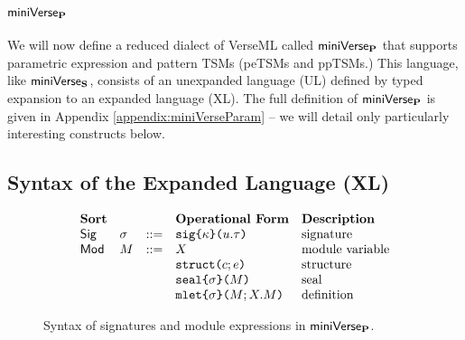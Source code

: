 \section{\texorpdfstring{$\miniVerseParam$}{miniVerseP}}\label{sec:miniVerseP}
We will now define a reduced dialect of VerseML called $\miniVerseParam$ that supports parametric expression and pattern TSMs (peTSMs and ppTSMs.) This language, like $\mathsf{miniVerse}_\textbf{S}$, consists of an unexpanded language (UL) defined by typed expansion to an expanded language (XL). The full definition of $\miniVerseParam$ is given in Appendix \ref{appendix:miniVerseParam} -- we will detail only  particularly interesting constructs below.

\subsection{Syntax of the Expanded Language (XL)}\label{sec:P-expanded-terms}

\begin{figure}[p] 
\[\begin{array}{lllllll}
\textbf{Sort} & & & \textbf{Operational Form} 
& \textbf{Description}\\
\mathsf{Sig} & \sigma & ::= & \asignature{\kappa}{u}{\tau} 
& \text{signature}\\
\mathsf{Mod} & M & ::= & X 
& \text{module variable}\\
&&& \astruct{c}{e} 
& \text{structure}\\
&&& \aseal{\sigma}{M} 
& \text{seal}\\
&&& \amlet{\sigma}{M}{X}{M} %
& \text{definition}
\end{array}\]
\caption[Syntax of signatures and module expressions in $\miniVerseParam$]{Syntax of signatures and module expressions in $\miniVerseParam$.}
\label{fig:P-modules-signatures}
\end{figure}


